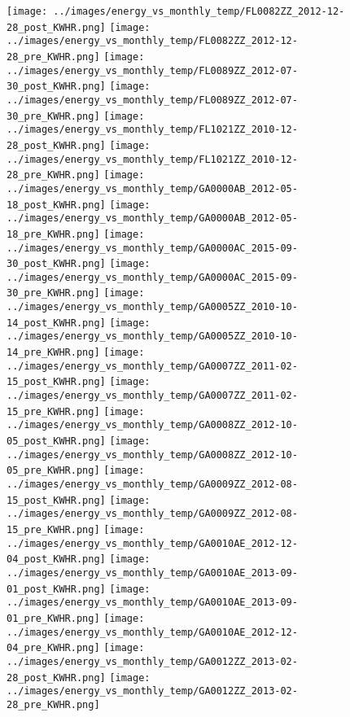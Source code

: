 \clearpage
\begin{figure}
\centering
\texttt{[image: ../images/energy\_vs\_monthly\_temp/FL0082ZZ\_2012-12-28\_post\_KWHR.png]}
\texttt{[image: ../images/energy\_vs\_monthly\_temp/FL0082ZZ\_2012-12-28\_pre\_KWHR.png]}
\texttt{[image: ../images/energy\_vs\_monthly\_temp/FL0089ZZ\_2012-07-30\_post\_KWHR.png]}
\texttt{[image: ../images/energy\_vs\_monthly\_temp/FL0089ZZ\_2012-07-30\_pre\_KWHR.png]}
\texttt{[image: ../images/energy\_vs\_monthly\_temp/FL1021ZZ\_2010-12-28\_post\_KWHR.png]}
\texttt{[image: ../images/energy\_vs\_monthly\_temp/FL1021ZZ\_2010-12-28\_pre\_KWHR.png]}
\texttt{[image: ../images/energy\_vs\_monthly\_temp/GA0000AB\_2012-05-18\_post\_KWHR.png]}
\texttt{[image: ../images/energy\_vs\_monthly\_temp/GA0000AB\_2012-05-18\_pre\_KWHR.png]}
\texttt{[image: ../images/energy\_vs\_monthly\_temp/GA0000AC\_2015-09-30\_post\_KWHR.png]}
\texttt{[image: ../images/energy\_vs\_monthly\_temp/GA0000AC\_2015-09-30\_pre\_KWHR.png]}
\texttt{[image: ../images/energy\_vs\_monthly\_temp/GA0005ZZ\_2010-10-14\_post\_KWHR.png]}
\texttt{[image: ../images/energy\_vs\_monthly\_temp/GA0005ZZ\_2010-10-14\_pre\_KWHR.png]}
\texttt{[image: ../images/energy\_vs\_monthly\_temp/GA0007ZZ\_2011-02-15\_post\_KWHR.png]}
\texttt{[image: ../images/energy\_vs\_monthly\_temp/GA0007ZZ\_2011-02-15\_pre\_KWHR.png]}
\texttt{[image: ../images/energy\_vs\_monthly\_temp/GA0008ZZ\_2012-10-05\_post\_KWHR.png]}
\texttt{[image: ../images/energy\_vs\_monthly\_temp/GA0008ZZ\_2012-10-05\_pre\_KWHR.png]}
\texttt{[image: ../images/energy\_vs\_monthly\_temp/GA0009ZZ\_2012-08-15\_post\_KWHR.png]}
\texttt{[image: ../images/energy\_vs\_monthly\_temp/GA0009ZZ\_2012-08-15\_pre\_KWHR.png]}
\texttt{[image: ../images/energy\_vs\_monthly\_temp/GA0010AE\_2012-12-04\_post\_KWHR.png]}
\texttt{[image: ../images/energy\_vs\_monthly\_temp/GA0010AE\_2013-09-01\_post\_KWHR.png]}
\texttt{[image: ../images/energy\_vs\_monthly\_temp/GA0010AE\_2013-09-01\_pre\_KWHR.png]}
\texttt{[image: ../images/energy\_vs\_monthly\_temp/GA0010AE\_2012-12-04\_pre\_KWHR.png]}
\texttt{[image: ../images/energy\_vs\_monthly\_temp/GA0012ZZ\_2013-02-28\_post\_KWHR.png]}
\texttt{[image: ../images/energy\_vs\_monthly\_temp/GA0012ZZ\_2013-02-28\_pre\_KWHR.png]}
\end{figure}
